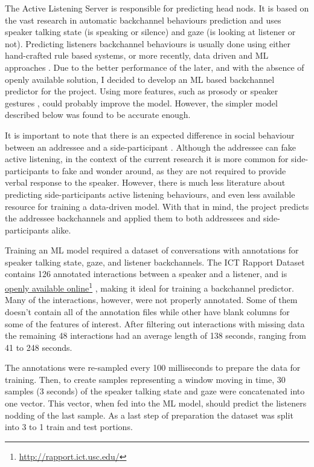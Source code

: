\documentclass[]{simple-thesis}
\newcommand\fnurl[2]{%
  \href{#2}{#1}\footnote{\url{#2}}%
}
\begin{document}
The Active Listening Server is responsible for predicting head nods.
It is based on the vast research in automatic backchannel behaviours prediction and uses speaker talking state (is speaking or silence) and gaze (is looking at listener or not).
Predicting listeners backchannel behaviours is usually done using either hand-crafted rule based systems, or more recently, data driven and ML approaches \citep{Morency2008}.
Due to the better performance of the later, and with the absence of openly available solution, I decided to develop an ML based backchannel predictor for the project.
Using more features, such as prosody \citep{Ward2000} or speaker gestures \citep{Gratch2006}, could probably improve the model.
However, the simpler model described below was found to be accurate enough.

It is important to note that there is an expected difference in social behaviour between an addressee and a side-participant \citep{Clark1982}.
Although the addressee can fake active listening, in the context of the current research it is more common for side-participants to fake and wonder around, as they are not required to provide verbal response to the speaker.
However, there is much less literature about predicting side-participants active listening behaviours, and even less available resource for training a data-driven model.
With that in mind, the project predicts the addressee backchannels and applied them to both addressees and side-participants alike.

Training an ML model required a dataset of conversations with annotations for speaker talking state, gaze, and listener backchannels.
The ICT Rapport Dataset \citep{Gratch2007} contains 126 annotated interactions between a speaker and a listener, and is \fnurl{openly available online}{http://rapport.ict.usc.edu/}, making it ideal for training a backchannel predictor.
Many of the interactions, however, were not properly annotated.
Some of them doesn't contain all of the annotation files while other have blank columns for some of the features of interest.
After filtering out interactions with missing data the remaining 48 interactions had an average length of 138 seconds, ranging from 41 to 248 seconds.

The annotations were re-sampled every 100 milliseconds to prepare the data for training.
Then, to create samples representing a window moving in time, 30 samples (3 seconds) of the speaker talking state and gaze were concatenated into one vector.
This vector, when fed into the ML model, should predict the listeners nodding of the last sample.
As a last step of preparation the dataset was split into 3 to 1 train and test portions.
\end{document}
